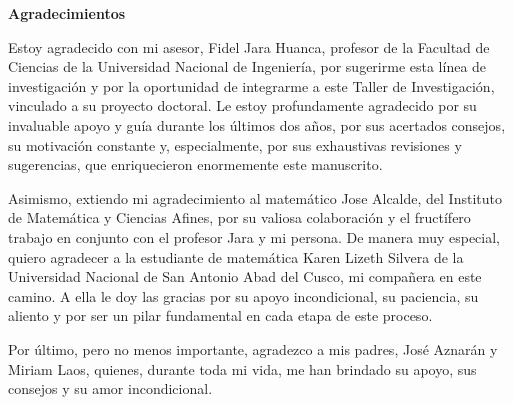 \newpage\vspace*{0.1\textheight}
\begin{flushleft}
	\textbf{Agradecimientos}\par
	Estoy agradecido con mi asesor, Fidel Jara Huanca, profesor de la
	Facultad de Ciencias de la Universidad Nacional de Ingeniería, por
	sugerirme esta línea de investigación y por la oportunidad de
	integrarme a este Taller de Investigación, vinculado a su proyecto
	doctoral.
	Le estoy profundamente agradecido por su invaluable apoyo y guía
	durante los últimos dos años, por sus acertados consejos, su
	motivación constante y, especialmente, por sus exhaustivas revisiones
	y sugerencias, que enriquecieron enormemente este manuscrito.

	Asimismo, extiendo mi agradecimiento al matemático Jose Alcalde, del
	Instituto de Matemática y Ciencias Afines, por su valiosa
	colaboración y el fructífero trabajo en conjunto con el profesor Jara
	y mi persona.
	De manera muy especial, quiero agradecer a la estudiante de
	matemática Karen Lizeth Silvera de la Universidad Nacional de San
	Antonio Abad del Cusco, mi compañera en este camino.
	A ella le doy las gracias por su apoyo incondicional, su paciencia,
	su aliento y por ser un pilar fundamental en cada etapa de este
	proceso.

	Por último, pero no menos importante, agradezco a mis padres,
	José Aznarán y Miriam Laos, quienes, durante toda mi vida, me han
	brindado su apoyo, sus consejos y su amor incondicional.
\end{flushleft}
